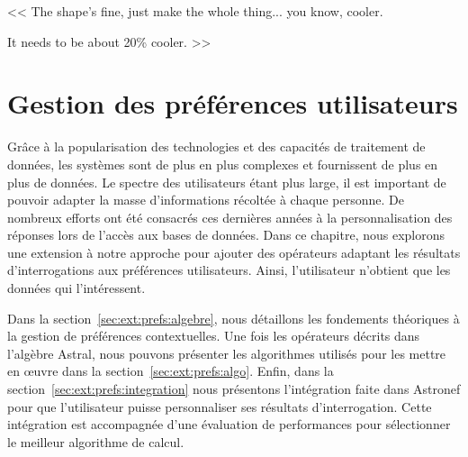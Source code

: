 \begin{savequote}[6cm]
<< The shape's fine, just make the whole thing... you know, cooler. 

\quad It needs to be about 20\% cooler. >>
\end{savequote}
\chapter{Gestion des préférences utilisateurs}\label{chap:prefs}
\chaptertoc

Grâce à la popularisation des technologies et des capacités de traitement de données, les systèmes sont de plus en plus complexes et fournissent de plus en plus de données. Le spectre des utilisateurs étant plus large, il est important de pouvoir adapter la masse d'informations récoltée à chaque personne. De nombreux efforts ont été consacrés ces dernières années à la personnalisation des réponses lors de l'accès aux bases de données. Dans ce chapitre, nous explorons une extension à notre approche pour ajouter des opérateurs adaptant les résultats d'interrogations aux préférences utilisateurs. Ainsi, l'utilisateur n'obtient que les données qui l'intéressent.

Dans la section~\ref{sec:ext:prefs:algebre}, nous détaillons les fondements théoriques à la gestion de préférences contextuelles. Une fois les opérateurs décrits dans l'algèbre Astral, nous pouvons présenter les algorithmes utilisés pour les mettre en œuvre dans la section~\ref{sec:ext:prefs:algo}. Enfin, dans la section~\ref{sec:ext:prefs:integration} nous présentons l'intégration faite dans Astronef pour que l'utilisateur puisse personnaliser ses résultats d'interrogation. Cette intégration est accompagnée d'une évaluation de performances pour sélectionner le meilleur algorithme de calcul.





